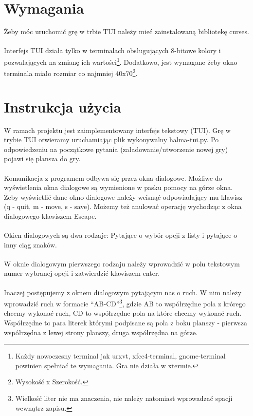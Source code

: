 \documentclass[12pt, titlepage]{article}
\begin{document}
\pagebreak
\section{Wymagania}
Żeby móc uruchomić grę w trbie TUI należy mieć zainstalowaną
bibliotekę curses.
\\~\\
Interfejs TUI działa tylko w terminalach obsługujących 8-bitowe
kolory i pozwalających na zmianę ich wartości\footnote{Każdy nowoczesny terminal jak urxvt, xfce4-terminal, gnome-terminal powinien spełniać te wymagania. Gra nie działa w xtermie.}.
Dodatkowo, jest wymagane żeby okno terminala miało rozmiar co
najmniej 40x70\footnote{Wysokość x Szerokość.}.

\section{Instrukcja użycia}
W ramach projektu jest zaimplementowany interfejs tekstowy (TUI).
Grę w trybie TUI otwieramy uruchamiając plik wykonywalny
halma-tui.py. Po odpowiedzeniu na początkowe pytania
(załadowanie/utworzenie nowej gry) pojawi się plansza do gry.
\\~\\
Komunikacja z programem odbywa się przez okna dialogowe.
Możliwe do wyświetlenia okna dialogowe są wymienione
w pasku pomocy na górze okna. Żeby wyświetlić dane okno
dialogowe należy wcisnąć odpowiadający mu klawisz (q - quit,
m - move, s - save). Możemy też anulować operację wychodząc
z okna dialogowego klawiszem Escape.
\\~\\
Okien dialogowych są dwa rodzaje: Pytające o wybór opcji z listy i
pytające o inny ciąg znaków.
\\~\\
W oknie dialogowym pierwszego rodzaju należy wprowadzić w
polu tekstowym numer wybranej opcji i zatwierdzić
klawiszem enter.
\\~\\
Inaczej postępujemy z oknem dialogowym pytającym nas o ruch.
W nim należy wprowadzić ruch w formacie "`AB-CD"'\footnote{Wielkość liter nie ma znaczenia, nie należy natomiast wprowadzać spacji wewnątrz zapisu.}, gdzie AB
to współrzędne pola z krórego chcemy wykonać ruch, CD to
współrzędne pola na które chcemy wykonać ruch. Współrzędne
to para literek którymi podpisane są pola z boku planszy -
pierwsza współrzędna z lewej strony planszy, druga współrzędna
na górze.

\pagebreak
\end{document}
